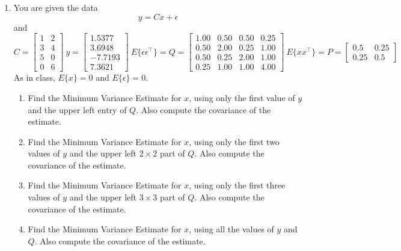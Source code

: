 \documentclass[letterpaper]{article}
\begin{document}
\begin{enumerate}

\item You are given the data
$$ y = Cx + \epsilon$$
and
$$ C=\left[\begin{array}{rr}  1&   2\\  3&   4\\  5&   0\\  0&   6\end{array} \right] ~y=\left[  \begin{array}{r}1.5377\\3.6948\\-7.7193\\7.3621\end{array}\right] ~ E\{ \epsilon \epsilon^\top \} = Q=\left[ \begin{array}{rrrr}1.00& 0.50& 0.50& 0.25\\0.50& 2.00& 0.25& 1.00\\0.50& 0.25& 2.00& 1.00\\0.25& 1.00& 1.00& 4.00\end{array}
\right] ~ E\{ x x^\top \} = P=\left[\begin{array}{rr}  0.5&   0.25\\ 0.25 &   0.5\end{array} \right] $$
As in class, $E\{ x\}=0$ and $E\{ \epsilon \}=0$.

        \begin{enumerate}
\setlength{\itemsep}{.1in}
\renewcommand{\labelenumi}{(\alph{enumi})}

\item  Find the Minimum Variance Estimate for $x$, using only the first value of $y$ and the upper left entry of $Q$. Also compute the covariance of the estimate.

\item  Find the Minimum Variance Estimate for $x$, using only the first two values of $y$ and the upper left $2 \times 2$ part of $Q$. Also compute the covariance of the estimate.

\item  Find the Minimum Variance Estimate for $x$, using only the first three values of $y$ and the upper left $3 \times 3$ part of $Q$. Also compute the covariance of the estimate.

\item  Find the Minimum Variance Estimate for $x$, using  all the values of $y$ and $Q$. Also compute the covariance of the estimate.
\end{enumerate}


\end{enumerate}
\end{document}
